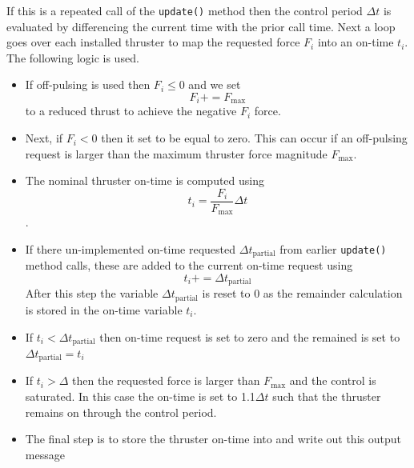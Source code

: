 If this is a repeated call of the {\tt update()} method then the control period $\Delta t$ is evaluated by differencing the current time with the prior call time.  Next a loop goes over each installed thruster to map the requested force $F_{i}$ into an on-time $t_{i}$.  The following logic is used.  
\begin{itemize}
	\item If off-pulsing is used then $F_{i}\le 0$ and we set $$F_{i} += F_{\text{max}}$$ to a reduced thrust to achieve the negative $F_{i}$ force.  
	\item Next, if $F_{i} < 0$ then it set to be equal to zero.  This can occur if an off-pulsing request is larger than the maximum thruster force magnitude $F_{\text{max}}$.  
	\item The nominal thruster on-time is computed using $$t_{i}  = \dfrac{F_{i}}{F_{\text{max}}} \Delta t$$. 
	\item If there un-implemented on-time requested $\Delta t_{\text{partial}}$ from earlier  {\tt update()} method calls, these are added to the current on-time request using $$t_{i} += \Delta t_{\text{partial}}$$ After this step the variable $\Delta t_{\text{partial}}$ is reset to 0 as the remainder calculation is stored in the on-time variable $t_{i}$.
	\item If $t_{i} < \Delta t_{\text{partial}}$ then on-time request is set to zero and the remained is set to $\Delta t_{\text{partial}} = t_{i}$
	\item If $t_{i} > \Delta $ then the requested force is larger than $F_{\text{max}}$ and the control is saturated.  In this case the on-time is set to 1.1$\Delta t$ such that the thruster remains on through the control period.
	\item The final step is to store the thruster on-time into  and write out this output message
\end{itemize}

